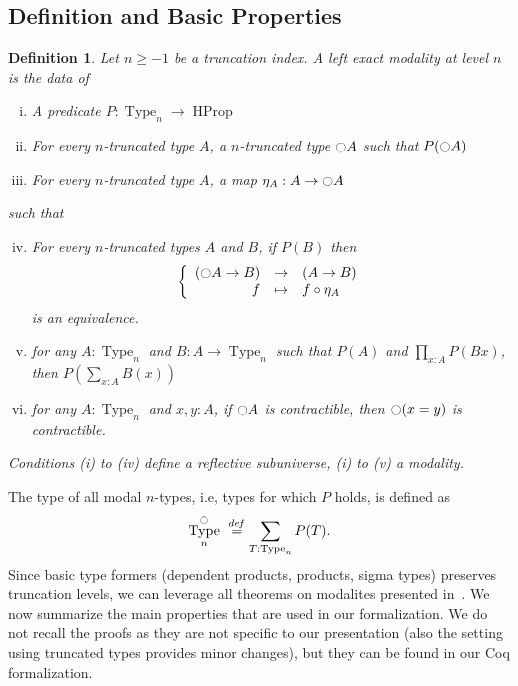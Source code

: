 \documentclass[conference]{IEEEtran}
\newtheorem{defi}[thm]{Definition}
\newcommand \defeq {\overset{de\hspace{-0.2ex}f}{=}}
\newcommand{\ie}{i.e,\xspace}
\DeclareMathOperator{\Type}{Type}
\DeclareMathOperator{\HProp}{HProp}
\newcommand{\modal}{\ensuremath{\ocircle}}
\begin{document}
\subsection{Definition and Basic Properties}
\label{sec:definition}

\begin{defi}
  \label{sec:defin-basic-prop-1}
  Let $n\geq -1$ be a truncation index. A left exact modality at level
  $n$ is the data of
  \begin{enumerate}[(i)]
  \item A predicate $P:\Type_n \to \HProp$
  \item For every $n$-truncated type $A$, a $n$-truncated type
    $\modal A$ such that $P(\modal A)$
  \item For every $n$-truncated type $A$, a map $\eta_A:A \to
    \modal A$
  \end{enumerate}
  such that
  \begin{enumerate}[(i)]
    \setcounter{enumi}{3}
  \item For every $n$-truncated types $A$ and $B$, if $P(B)$ then
    $$\left\{
      \begin{array}{rcl}
        (\modal A \to B) & \to & (A \to B) \\
        f & \mapsto & f \circ \eta_A
      \end{array} \right.$$
    is an equivalence.
  \item for any $A:\Type_n$ and $B:A \to \Type_n$ such that $P(A)$
    and $\prod_{x:A} P(B x)$, then $P\left( \sum_{x:A} B(x)\right)$
  \item for any $A:\Type_n$ and $x,y:A$, if $\modal A$ is
    contractible, then $\modal (x=y)$ is contractible.
  \end{enumerate}
  Conditions (i) to (iv) define a {\em reflective subuniverse}, (i) to
  (v) a {\em modality}.
\end{defi}

The type of all modal $n$-types, \ie types for which $P$ holds, is
defined as %
$$
\Type^\modal_n \ \defeq \sum_{T : \Type_n} P (T).
$$
%
Since basic type formers (dependent products, products, sigma types)
preserves truncation levels, we can leverage all theorems on modalites
presented in~\cite[Chapter 7.7]{hottbook}.
%
We now summarize the main properties that are used in our
formalization. We do not recall the proofs as they are not specific to
our presentation (also the setting using truncated types provides
minor changes), but they can be found in our Coq formalization. 
 
\end{document}
